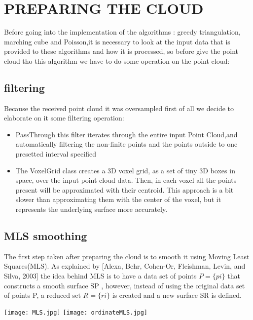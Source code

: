 \documentclass[paper=a4, fontsize=11pt]{scrartcl}	%
\numberwithin{equation}{section}															%
\numberwithin{figure}{section}																%
\numberwithin{table}{section}																%
\begin{document}
 
 


 

\section{ PREPARING THE CLOUD}
Before going into the implementation of the algorithms : greedy triangulation, marching cube and Poisson,it is necessary to look at the input data that is provided to these algorithms and how it is processed, so before give the point cloud tho this algorithm we have to do some operation on the point cloud:
\subsection{filtering}
Because the received point cloud it was oversampled first of all we decide to elaborate on it some filtering operation: 
\begin{itemize}
	\item PassThrough this filter iterates through the entire input Point Cloud,and  automatically filtering the non-finite points and the points outside to one presetted interval specified
	\item The VoxelGrid class creates a 3D voxel grid, as a set of tiny 3D boxes in space, over the input point cloud data. Then, in each voxel all the points present will be approximated with their centroid. This approach is a bit slower than approximating them with the center of the voxel, but it represents the underlying surface more accurately.
\end{itemize}
\subsection{MLS smoothing}
The first step taken after preparing the cloud is to smooth it using Moving Least Squares(MLS). As explained by [Alexa, Behr, Cohen-Or, Fleishman, Levin, and Silva, 2003] the idea behind MLS is to have a data set of points $P = \{pi\}$ that constructs a smooth surface SP , however, instead of using the original data set of points P, a reduced set $R = \{ri\}$ is created and a new surface SR is defined.

\begin{center}
    \texttt{[image: MLS.jpg]}    
	\texttt{[image: ordinateMLS.jpg]}

		


\end{center}
\end{document}
